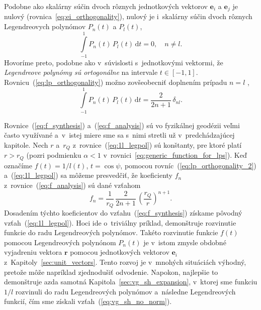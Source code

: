 \documentclass[a4paper,12pt]{book}
\newcommand{\diff}{\mathrm d}
\let\vec\mathbf
\begin{document}
Podobne ako skalárny súčin dvoch rôznych jednotkových vektorov $\vec e_i$ 
a $ \vec e_j$ je nulový (rovnica~\ref{eq:ei_orthogonality}), nulový je 
i~skalárny súčin dvoch rôznych Legendreovych polynómov $P_n(t)$ a $P_l(t)$,
%
\begin{equation}
\label{eq:lp_orthogonality}
\int\limits_{-1}^1 P_n(t) \, P_l(t) \, \diff t = 0{,} \quad n \neq l{.}
\end{equation}
%
Hovoríme preto, podobne ako v~súvislosti s~jednotkovými vektormi, že
\emph{Legendreove polynómy sú ortogonálne} na intervale $t \in [-1, 1].$
Rovnicu~(\ref{eq:lp_orthogonality}) možno zovšeobecniť doplnením prípadu $n
= l$ \parencite[napríklad][]{Hobson},
%
\begin{equation}
\label{eq:lp_orthogonality_2}
\int\limits_{-1}^1 P_n(t) \, P_l(t) \, \diff t = \frac{2}{2n + 1} \, 
\delta_{nl}{.}
\end{equation}

Rovnice~(\ref{eq:f_synthesis}) a~(\ref{eq:f_analysis}) sú vo fyzikálnej
geodézii veľmi často využívané a~v~istej miere sme sa s~nimi stretli už
v~predchádzajúcej kapitole.  Nech $r$ a~$r_Q$ z~rovnice~(\ref{eq:1l_legpol}) sú 
konštanty, pre ktoré platí $r > r_Q$ (pozri podmienku
$\alpha < 1$ v~rovnici~\ref{eq:generic_function_for_lps}).  Keď označíme $f(t)
= 1 \slash l(t)$, $t = \cos\psi$, pomocou rovníc~(\ref{eq:lp_orthogonality_2})
a~(\ref{eq:1l_legpol}) sa môžeme presvedčiť, že koeficienty $f_n$
z~rovnice~(\ref{eq:f_analysis}) sú dané vzťahom
%
\begin{equation}
f_n = \frac{1}{r_Q} \, \frac{2}{2n + 1} \, \left( \frac{r_Q}{r} \right)^{n
+ 1}{.}
\end{equation}
%
Dosadením týchto koeficientov do vzťahu~(\ref{eq:f_synthesis}) získame pôvodný 
vzťah~(\ref{eq:1l_legpol}).  Hoci ide o~triviálny príklad, demonštruje 
rozvinutie funkcie do radu Legendreových polynómov.  Takéto rozvinutie funkcie 
$f(t)$ pomocou Legendreových polynónom $P_n(t)$ je v~istom zmysle obdobné 
vyjadreniu vektora $\vec r$ pomocou jednotkových vektorov $\vec e_i$ 
z~Kapitoly~\ref{sec:unit_vectors}.  Tento rozvoj je v~mnohých situáciách 
výhodný, pretože môže napríklad zjednodušiť odvodenie.  Napokon, najlepšie to 
demonštruje azda samotná Kapitola~\ref{sec:vg_sh_expansion}, v~ktorej sme 
funkciu $1 \slash l$ rozvinuli do radu Legendreových polynómov a~následne 
Legendreových funkcií, čím sme získali vzťah~(\ref{eq:vg_sh_no_norm}).
\end{document}
